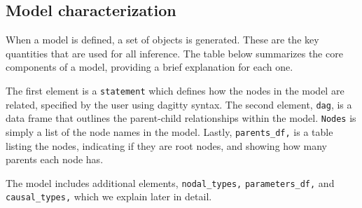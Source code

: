\documentclass[
  article]{jss}
\begin{document}
\hypertarget{model-characterization}{%
\subsection{Model characterization}\label{model-characterization}}

When a model is defined, a set of objects is generated. These are the
key quantities that are used for all inference. The table below
summarizes the core components of a model, providing a brief explanation
for each one.

The first element is a \texttt{statement} which defines how the nodes in
the model are related, specified by the user using dagitty syntax. The
second element, \texttt{dag}, is a data frame that outlines the
parent-child relationships within the model. \texttt{Nodes} is simply a
list of the node names in the model. Lastly, \texttt{parents\_df,} is a
table listing the nodes, indicating if they are root nodes, and showing
how many parents each node has.

The model includes additional elements, \texttt{nodal\_types,}
\texttt{parameters\_df,} and \texttt{causal\_types,} which we explain
later in detail.
\end{document}
